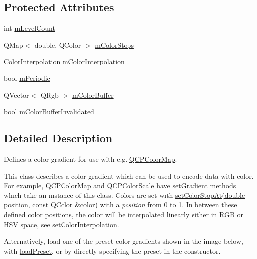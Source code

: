 \subsection*{Protected Attributes}
\begin{DoxyCompactItemize}
\item 
int \hyperlink{class_q_c_p_color_gradient_a98fb68e359904b2c991fcae3e38a211a}{m\+Level\+Count}
\item 
Q\+Map$<$ double, Q\+Color $>$ \hyperlink{class_q_c_p_color_gradient_a9e11a2b0974ef289d12c324822bc3a3e}{m\+Color\+Stops}
\item 
\hyperlink{class_q_c_p_color_gradient_ac5dca17cc24336e6ca176610e7f77fc1}{Color\+Interpolation} \hyperlink{class_q_c_p_color_gradient_a028cef73d863800a9ee93ffd641cce01}{m\+Color\+Interpolation}
\item 
bool \hyperlink{class_q_c_p_color_gradient_a4b07deeb20ca1ee2d5ea7e01bf0420af}{m\+Periodic}
\item 
Q\+Vector$<$ Q\+Rgb $>$ \hyperlink{class_q_c_p_color_gradient_af8b5f0739faa5f8295154d47ce38ecff}{m\+Color\+Buffer}
\item 
bool \hyperlink{class_q_c_p_color_gradient_abacf55e11f67d6722a687af1bb2687bd}{m\+Color\+Buffer\+Invalidated}
\end{DoxyCompactItemize}


\subsection{Detailed Description}
Defines a color gradient for use with e.\+g. \hyperlink{class_q_c_p_color_map}{Q\+C\+P\+Color\+Map}. 

This class describes a color gradient which can be used to encode data with color. For example, \hyperlink{class_q_c_p_color_map}{Q\+C\+P\+Color\+Map} and \hyperlink{class_q_c_p_color_scale}{Q\+C\+P\+Color\+Scale} have \hyperlink{class_q_c_p_color_map_a7313c78360471cead3576341a2c50377}{set\+Gradient} methods which take an instance of this class. Colors are set with \hyperlink{class_q_c_p_color_gradient_a3b48be5e78079db1bb2a1188a4c3390e}{set\+Color\+Stop\+At(double position, const Q\+Color \&color)} with a {\itshape position} from 0 to 1. In between these defined color positions, the color will be interpolated linearly either in R\+G\+B or H\+S\+V space, see \hyperlink{class_q_c_p_color_gradient_aa13fda86406e1d896a465a409ae63b38}{set\+Color\+Interpolation}.

Alternatively, load one of the preset color gradients shown in the image below, with \hyperlink{class_q_c_p_color_gradient_aa0aeec1528241728b9671bf8e60b1622}{load\+Preset}, or by directly specifying the preset in the constructor.



